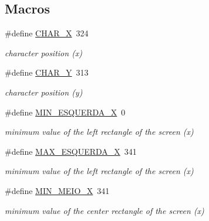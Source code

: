 \subsection*{Macros}
\begin{DoxyCompactItemize}
\item 
\mbox{\label{group___project_ga2bd150533f839ae2c693ab76e55799c1}} 
\#define \hyperlink{group___project_ga2bd150533f839ae2c693ab76e55799c1}{C\+H\+A\+R\+\_\+X}~324
\begin{DoxyCompactList}\small\item\em character position (x) \end{DoxyCompactList}\item 
\mbox{\label{group___project_ga9528c0d136b8c20810d6aac309767e28}} 
\#define \hyperlink{group___project_ga9528c0d136b8c20810d6aac309767e28}{C\+H\+A\+R\+\_\+Y}~313
\begin{DoxyCompactList}\small\item\em character position (y) \end{DoxyCompactList}\item 
\mbox{\label{group___project_ga93acb4f08ef430ffe2ff6d18f37adfde}} 
\#define \hyperlink{group___project_ga93acb4f08ef430ffe2ff6d18f37adfde}{M\+I\+N\+\_\+\+E\+S\+Q\+U\+E\+R\+D\+A\+\_\+X}~0
\begin{DoxyCompactList}\small\item\em minimum value of the left rectangle of the screen (x) \end{DoxyCompactList}\item 
\mbox{\label{group___project_ga4463271563a547fe21abbfa253d7ca6b}} 
\#define \hyperlink{group___project_ga4463271563a547fe21abbfa253d7ca6b}{M\+A\+X\+\_\+\+E\+S\+Q\+U\+E\+R\+D\+A\+\_\+X}~341
\begin{DoxyCompactList}\small\item\em minimum value of the left rectangle of the screen (x) \end{DoxyCompactList}\item 
\mbox{\label{group___project_ga2de13b7e3c25e2f8ad5720113ccf1c09}} 
\#define \hyperlink{group___project_ga2de13b7e3c25e2f8ad5720113ccf1c09}{M\+I\+N\+\_\+\+M\+E\+I\+O\+\_\+X}~341
\begin{DoxyCompactList}\small\item\em minimum value of the center rectangle of the screen (x) \end{DoxyCompactList}\item 

\end{DoxyCompactItemize}
